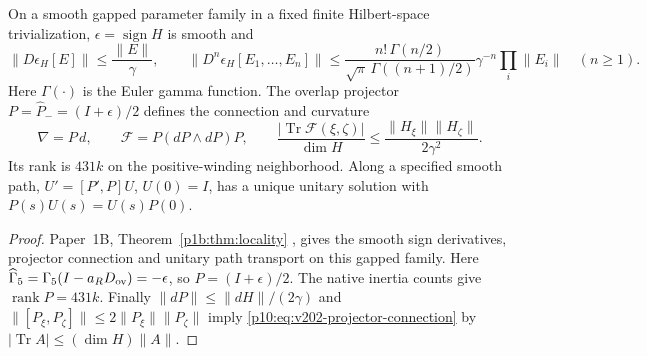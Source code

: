 \documentclass[12pt,a4paper]{article}
\begin{document}
\begin{theorem}
\label{p10:thm:v202-chiral-projector-transport}
On a smooth gapped parameter family in a fixed finite Hilbert-space
trivialization, $\epsilon=\operatorname{sign}H$ is smooth and
\[
 \|D\epsilon_H[E]\|\le\frac{\|E\|}{\gamma},\qquad
 \|D^n\epsilon_H[E_1,\ldots,E_n]\|
 \le\frac{n!\,\Gamma(n/2)}{\sqrt\pi\,\Gamma((n+1)/2)}
       \gamma^{-n}\prod_i\|E_i\|\quad(n\ge1).
\]
Here $\Gamma(\cdot)$ is the Euler gamma function. The overlap projector
$P=\widehat P_-=(I+\epsilon)/2$ defines the connection and curvature
\begin{equation}
 \nabla=P\,d,\qquad \mathcal F=P(dP\wedge dP)P,
 \qquad
 \frac{|\operatorname{Tr}\mathcal F(\xi,\zeta)|}{\dim H}
 \le\frac{\|H_\xi\|\|H_\zeta\|}{2\gamma^2}.
 \label{p10:eq:v202-projector-connection}
\end{equation}
Its rank is $431k$ on the positive-winding neighborhood. Along a specified
smooth path, $U'=[P',P]U$, $U(0)=I$, has a unique unitary solution with
$P(s)U(s)=U(s)P(0)$.
\end{theorem}
\begin{proof}
Paper~1B, Theorem~\ref{p1b:thm:locality}
\cite{Kugelmann2026Paper1B}, gives the smooth sign derivatives,
projector connection and unitary path transport on this gapped family.
Here $\widehat\Gamma_5=\Gamma_5(I-a_RD_{\rm ov})=-\epsilon$,
so $P=(I+\epsilon)/2$. The native inertia counts give
$\operatorname{rank}P=431k$. Finally
$\|dP\|\le\|dH\|/(2\gamma)$ and
$\|[P_\xi,P_\zeta]\|\le2\|P_\xi\|\|P_\zeta\|$ imply
\eqref{p10:eq:v202-projector-connection} by
$|\operatorname{Tr}A|\le(\dim H)\|A\|$.
\end{proof}
\end{document}
